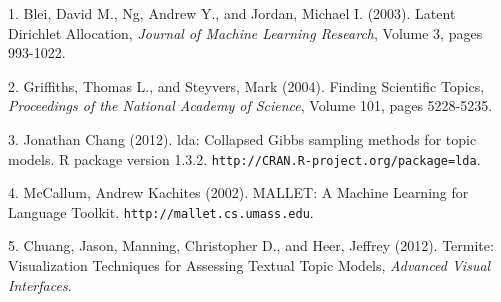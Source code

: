\documentclass[12pt]{article}
\begin{document}
1. Blei, David M., Ng, Andrew Y., and Jordan, Michael I. (2003). Latent Dirichlet Allocation, \emph{Journal of Machine Learning Research}, Volume 3, pages 993-1022.

2. Griffiths, Thomas L., and Steyvers, Mark (2004). Finding Scientific Topics, \emph{Proceedings of the National Academy of Science}, Volume 101, pages 5228-5235.

3. Jonathan Chang (2012). lda: Collapsed Gibbs sampling methods for topic models. R package version 1.3.2. \texttt{http://CRAN.R-project.org/package=lda}.

4. McCallum, Andrew Kachites (2002). MALLET: A Machine Learning for Language Toolkit. \texttt{http://mallet.cs.umass.edu}.

5. Chuang, Jason, Manning, Christopher D., and Heer, Jeffrey (2012). Termite: Visualization Techniques for Assessing Textual Topic Models, \emph{Advanced Visual Interfaces}.
\end{document}

